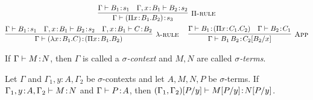 \documentclass[reqno, twoside]{article}
\begin{document}
\begin{definition}
\begin{adjustwidth}{-8pt}{0pt}
{\begin{equation*}
\begin{gathered}
                \infer[\Pi\mathsc{-rule}]{\Gamma\proves(\Pi x\!:\!B_1.B_2)\!:\!s_3}{\Gamma\proves B_1\!:\!s_1 & \Gamma,x\!:\!B_1\proves B_2\!:\!s_2}\\
                \infer[\lambda\mathsc{-rule}]{\Gamma\proves(\lambda x\!:\!B_1.C)\!:\!(\Pi x\!:\!B_1.B_2)}{\Gamma\proves B_1\!:\!s_1 & \Gamma,x\!:\!B_1\proves B_2\!:\!s_2 & \Gamma,x\!:\!B_1\proves C\!:\!B_2}\ \ \ \ 
                \infer[\mathsc{App}]{\Gamma\proves B_1\,B_2\!:\!C_2[B_2/x]}{\Gamma\proves B_1\!:\!(\Pi x\!:\!C_1.C_2) & \Gamma\proves B_2\!:\!C_1}
            \end{gathered}
        \end{equation*}}
        \end{adjustwidth}
    \end{definition}

    \begin{definition}
        If $\Gamma\vdash M\!:\!N$, then $\Gamma$ is called a \textit{$\sigma$-context} and $M,N$ are called \textit{$\sigma$-terms}.
    \end{definition}

    \begin{lemma}\label{lem:substitution}
        Let $\Gamma$ and $\Gamma_1,y\!:\!A,\Gamma_2$ be $\sigma$-contexts and let $A,M,N,P$ be $\sigma$-terms. If $\Gamma_1,y\!:\!A,\Gamma_2\vdash M\!:\!N$ and $\Gamma\vdash P\!:\!A$, then $(\Gamma_1,\Gamma_2)[P/y]\vdash M[P/y]\!:\!N[P/y]$.
    \end{lemma}
\end{document}
